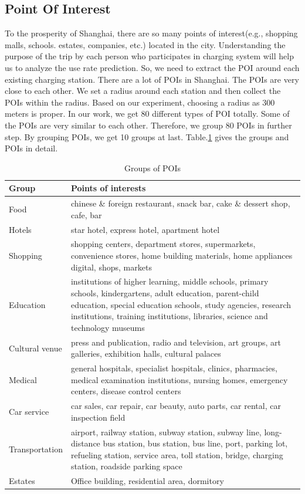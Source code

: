 \documentclass[conference]{IEEEtran}
\begin{document}
\subsection{Point Of Interest}
To the prosperity of Shanghai, there are so many points of interest(e.g., shopping malls, schools. estates, companies, etc.) located in the city.  Understanding the purpose of the trip by each person who participates in charging system will help us to analyze the use rate prediction. So, we need to extract the POI around each existing charging station. There are a lot of POIs in Shanghai. The POIs are very close to each other. We set a radius around each station and then collect the POIs within the radius. Based on our experiment, choosing a radius as 300 meters is proper. In our work, we get 80 different types of POI totally. Some of the POIs are very similar to each other. Therefore, we group 80 POIs in further step. By grouping POIs, we get 10 groups at last. Table.\ref{tab1} gives the groups and POIs in detail.

\begin{table}[htbp]
	\caption{Groups of POIs}
	\begin{center}
		\begin{tabular}{|l|p{5cm}|}
			\hline
			Group & Points of interests\\
			\hline
			Food & chinese \& foreign restaurant, snack bar, cake \& dessert shop, cafe, bar\\
			\hline
			Hotels & star hotel, express hotel, apartment hotel\\
			\hline
			Shopping & shopping centers, department stores, supermarkets, convenience stores, home building materials, home appliances digital, shops, markets\\
			\hline
			Education & institutions of higher learning, middle schools, primary schools, kindergartens, adult education, parent-child education, special education schools, study agencies, research institutions, training institutions, libraries, science and technology museums\\
			\hline
			Cultural venue & press and publication, radio and television, art groups, art galleries, exhibition halls, cultural palaces\\
			\hline
			Medical & general hospitals, specialist hospitals, clinics, pharmacies, medical examination institutions, nursing homes, emergency centers, disease control centers\\
			\hline
			Car service & car sales, car repair, car beauty, auto parts, car rental, car inspection field\\
			\hline
			Transportation & airport, railway station, subway station, subway line, long-distance bus station, bus station, bus line, port, parking lot, refueling station, service area, toll station, bridge, charging station, roadside parking space\\
			\hline
			Estates & Office building, residential area, dormitory\\
			\hline
		\end{tabular}
		\label{tab1}
	\end{center}
\end{table}
\end{document}
